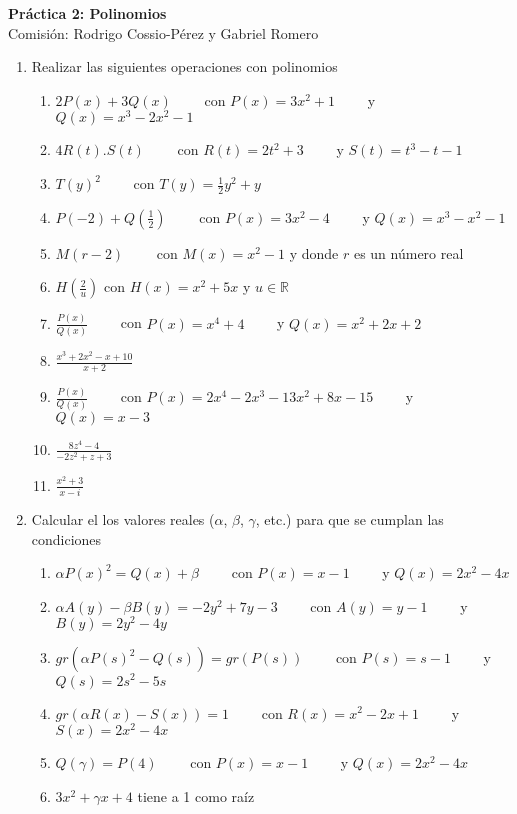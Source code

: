 \documentclass[a4paper]{article}
\newcommand{\exercise}{\item}
\newcommand{\df}[2]{\displaystyle\frac{#1}{#2}}
\begin{document}
\noindent \hrulefill 
\vspace{-7pt}
\begin{center} 
	\textbf{ Práctica 2: Polinomios } \\
	Comisión: Rodrigo Cossio-Pérez y Gabriel Romero
\end{center}
\vspace{-10pt}
\hrulefill
\begin{enumerate}
	\exercise Realizar las siguientes operaciones con polinomios
	\begin{enumerate} [label=(\alph*)]
		\item $2P(x)+3Q(x)$ ~~~~con $P(x)=3x^2+1$ ~~~~y $Q(x)=x^3-2x^2-1$
		\item $4R(t).S(t)$ ~~~~con $R(t)=2t^2+3$ ~~~~y $S(t)=t^3-t-1$
		\item $T(y)^2$ ~~~~con $T(y)=\df{1}{2}y^2+y$
		\item $P(-2)+Q\left(\df{1}{2}\right)$ ~~~~con $P(x)=3x^2-4$ ~~~~y $Q(x)=x^3-x^2-1$
		\item $M(r-2)$ ~~~~con $M(x)=x^2-1$ y donde $r$ es un número real
		\item $H\left(\df{2}{u}\right)$ con $H(x)=x^2+5x$ y $u \in \mathbb{R}$
		\item $\df{P(x)}{Q(x)}$ ~~~~con $P(x)=x^4+4$ ~~~~y $Q(x)=x^2+2x+2$
		\item $\df{x^3+2x^2-x+10}{x+2}$
		\item $\df{P(x)}{Q(x)}$ ~~~~con $P(x)=2x^4-2x^3-13x^2+8x-15$ ~~~~y $Q(x)=x-3$
		\item $\df{8z^4-4}{-2z^2+z+3}$
		\item $\df{x^2+3}{x-i}$
	\end{enumerate}
	\exercise Calcular el los valores reales ($\alpha$, $\beta$, $\gamma$, etc.) para que se cumplan las condiciones
	\begin{enumerate} [label=(\alph*)]
		\item $\alpha P(x)^2 = Q(x) +\beta$ ~~~~con $P(x)=x-1$ ~~~~y $Q(x)=2x^2-4x$
		\item $\alpha A(y)-\beta B(y) = -2y^2 +7y-3$ ~~~~con $A(y)=y-1$ ~~~~y $B(y)=2y^2-4y$
		\item $gr\left(\alpha P(s)^2 - Q(s)\right)=gr\left(P(s)\right)$ ~~~~con $P(s)=s-1$ ~~~~y $Q(s)=2s^2-5s$
		\item $gr\left(\alpha R(x) - S(x)\right)=1$ ~~~~con $R(x)=x^2-2x+1$ ~~~~y $S(x)=2x^2-4x$
		\item $Q(\gamma)=P(4)$ ~~~~con $P(x)=x-1$ ~~~~y $Q(x)=2x^2-4x$
		\item $3x^2+\gamma x+4$ tiene a 1 como raíz

\end{enumerate}
\end{enumerate}
\end{document}
